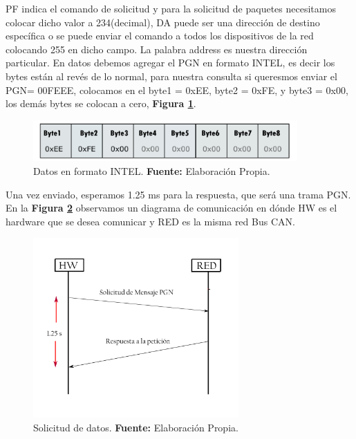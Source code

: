 PF  indica el comando de solicitud y para la solicitud de paquetes necesitamos colocar dicho valor a 234(decimal),   DA puede ser una dirección de destino específica o se puede enviar el comando a todos los dispositivos de la red colocando 255 en dicho campo. La palabra address es nuestra dirección particular. En datos debemos agregar el PGN en formato INTEL, es decir los bytes están al revés de lo normal,  para nuestra consulta si queresmos enviar el PGN= 00FEEE, colocamos en el byte1 = 0xEE, byte2 = 0xFE, y byte3  = 0x00, los demás bytes se colocan a cero, \textbf{Figura \ref{fig_datosj1939_c3}}.
    
    \begin{figure}[H]
		\centering
		\includegraphics[width=0.9\textwidth]{./Cap3imagen/datosJ1939.pdf}
		\caption[Datos en formato INTEL.]{Datos en formato INTEL.\textbf{ Fuente:} %
		Elaboración Propia.}
		\label{fig_datosj1939_c3} %
	\end{figure}


Una vez enviado, esperamos 1.25 ms para la respuesta, que será una trama PGN. En la \textbf{Figura \ref{fig_peticionj1939_c3}} observamos un diagrama de comunicación en dónde HW es el hardware que se desea comunicar y RED es la misma red Bus CAN.

        \begin{figure}[H]
		\centering
		\includegraphics[width=0.7\textwidth]{./Cap3imagen/peticionj1939.pdf}
		\caption[Solicitud de datos.]{Solicitud de datos.\textbf{ Fuente:} %
		Elaboración Propia.}
		\label{fig_peticionj1939_c3} %
    	\end{figure}



